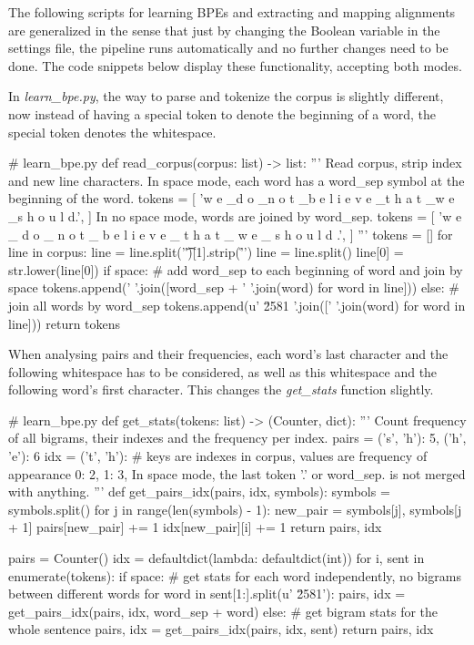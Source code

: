 The following scripts for learning BPEs and extracting and mapping alignments are generalized in the sense that just by changing the Boolean variable in the settings file, the pipeline runs automatically and no further changes need to be done. The code snippets below display these functionality, accepting both modes.

In \emph{learn\_bpe.py}, the way to parse and tokenize the corpus is slightly different, now instead of having a special token to denote the beginning of a word, the special token denotes the whitespace.

\begin{python}
# learn_bpe.py
def read_corpus(corpus: list) -> list:
  '''
  Read corpus, strip index and new line characters.
  In space mode, each word has a word_sep symbol at the beginning of the word.
  tokens = [
    'w e \_d o \_n o t \_b e l i e v e \_t h a t \_w e \_s h o u l d.',
  ]
  In no space mode, words are joined by word_sep.
  tokens = [
    'w e \_ d o \_ n o t \_ b e l i e v e \_ t h a t \_ w e \_ s h o u l d .',
  ]
  '''
  tokens = []
  for line in corpus:
    line = line.split('\t')[1].strip('\r\n ')
    line = line.split()
    line[0] = str.lower(line[0])
    if space:
      # add word_sep to each beginning of word and join by space
      tokens.append(' '.join([word_sep + ' '.join(word) for word in line]))
    else:
      # join all words by word_sep
      tokens.append(u' \u2581 '.join([' '.join(word) for word in line]))
  return tokens
\end{python}

When analysing pairs and their frequencies, each word's last character and the following whitespace has to be considered, as well as this whitespace and the following word's first character. This changes the \emph{get\_stats} function slightly.

\begin{python}
# learn_bpe.py
def get_stats(tokens: list) -> (Counter, dict):
  '''
  Count frequency of all bigrams, their indexes and the frequency per index.
  pairs = {
    ('s', 'h'): 5,
    ('h', 'e'): 6
  }
  idx = {
    ('t', 'h'): {
      # keys are indexes in corpus, values are frequency of appearance
      0: 2,
      1: 3,
    }
  }
  In space mode, the last token '.' or word_sep. is not merged with anything.
  '''
  def get_pairs_idx(pairs, idx, symbols):
    symbols = symbols.split()
    for j in range(len(symbols) - 1):
      new_pair = symbols[j], symbols[j + 1]
      pairs[new_pair] += 1
      idx[new_pair][i] += 1
    return pairs, idx

  pairs = Counter()
  idx = defaultdict(lambda: defaultdict(int))
  for i, sent in enumerate(tokens):
    if space:
      # get stats for each word independently, no bigrams between different words
      for word in sent[1:].split(u' \u2581'):
      pairs, idx = get_pairs_idx(pairs, idx, word_sep + word)
    else:
      # get bigram stats for the whole sentence
      pairs, idx = get_pairs_idx(pairs, idx, sent)
  return pairs, idx
\end{python}

